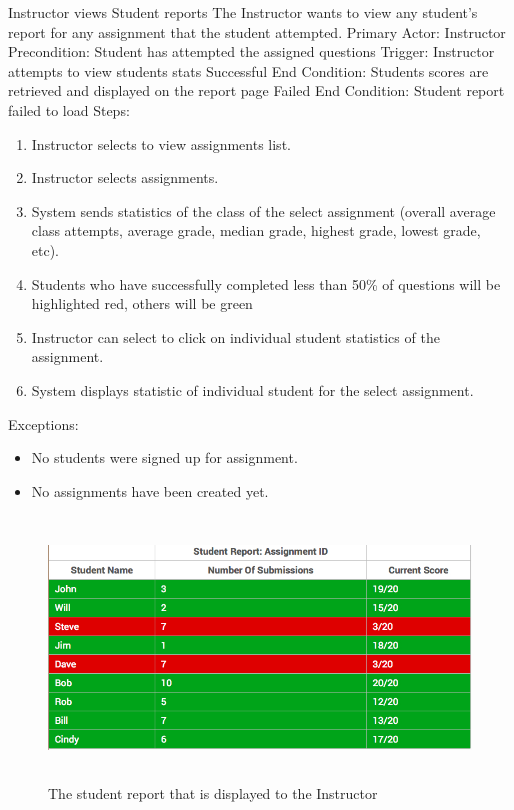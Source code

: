     \begin{section}{Instructor views Student reports}
		The Instructor wants to view any student's report for any assignment that the student attempted. \newline
		Primary Actor: Instructor \newline
		Precondition: Student has attempted the assigned questions \newline
		Trigger: Instructor attempts to view students stats \newline
		Successful End Condition: Students scores are retrieved and displayed on the report page \newline
		Failed End Condition: Student report failed to load \newline
		\newline
        Steps:
        \begin{enumerate}
            \item{Instructor selects to view assignments list.}
            \item{Instructor selects assignments.}
            \item{System sends statistics of the class of the select assignment (overall average class attempts, average grade, median grade, highest grade, lowest grade, etc).}
            \item{Students who have successfully completed less than 50\% of questions will be highlighted red, others will be green}
            \item{Instructor can select to click on individual student statistics of the assignment.}
			\item{System displays statistic of individual student for the select assignment.}
        \end{enumerate}
        Exceptions:
        \begin{itemize}
            \item{No students were signed up for assignment.}
			\item{No assignments have been created yet.}
        \end{itemize}
                        \begin{figure}[H]
            \centerline{\includegraphics[height=7cm]{StudentReport.jpg}}
            \caption{The student report that is displayed to the Instructor}
    \end{figure}
    \end{section}	
	

